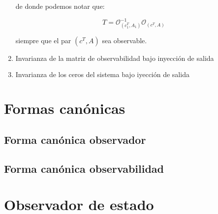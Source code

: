 \begin{enumerate}
			de donde podemos notar que:

			\begin{equation}
				T = \mathcal{O}_{(c_1^T, A_1)}^{-1} \mathcal{O}_{(c^T, A)}
			\end{equation}

			siempre que el par $(c^T, A)$ sea observable.

			\item Invarianza de la matriz de observabilidad bajo inyección de salida

			\item Invarianza de los ceros del sistema bajo iyección de salida
		\end{enumerate}


    \newpage
    \section{Formas canónicas}


        \subsection{Forma canónica observador}


        \subsection{Forma canónica observabilidad}


    \newpage
    \section{Observador de estado}
